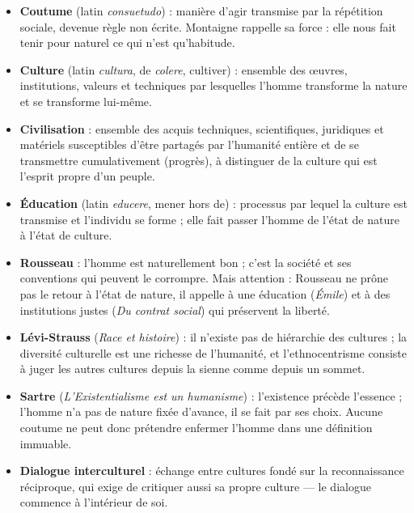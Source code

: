 \documentclass[11pt]{article}
\newcounter{popsec}
\newcounter{popsub}
\newcommand{\courssub}[1]{%
  \stepcounter{popsub}%
  \par\vspace{9pt}\noindent{\popxbold\fontsize{11.5}{13}\selectfont\color{popink}{\color{poporange}\thepopsec.\thepopsub}\hspace{6pt}#1}\par\nopagebreak\vspace{4pt}
}
\begin{document}
\begin{aretenir}
\begin{itemize}
\item \textbf{Coutume} (latin \emph{consuetudo}) : manière d'agir transmise par la répétition sociale, devenue règle non écrite. Montaigne rappelle sa force : elle nous fait tenir pour naturel ce qui n'est qu'habitude.
\item \textbf{Culture} (latin \emph{cultura}, de \emph{colere}, cultiver) : ensemble des œuvres, institutions, valeurs et techniques par lesquelles l'homme transforme la nature et se transforme lui-même.
\item \textbf{Civilisation} : ensemble des acquis techniques, scientifiques, juridiques et matériels susceptibles d'être partagés par l'humanité entière et de se transmettre cumulativement (progrès), à distinguer de la culture qui est l'esprit propre d'un peuple.
\item \textbf{Éducation} (latin \emph{educere}, mener hors de) : processus par lequel la culture est transmise et l'individu se forme ; elle fait passer l'homme de l'état de nature à l'état de culture.
\item \textbf{Rousseau} : l'homme est naturellement bon ; c'est la société et ses conventions qui peuvent le corrompre. Mais attention : Rousseau ne prône pas le retour à l'état de nature, il appelle à une éducation (\emph{Émile}) et à des institutions justes (\emph{Du contrat social}) qui préservent la liberté.
\item \textbf{Lévi-Strauss} (\emph{Race et histoire}) : il n'existe pas de hiérarchie des cultures ; la diversité culturelle est une richesse de l'humanité, et l'ethnocentrisme consiste à juger les autres cultures depuis la sienne comme depuis un sommet.
\item \textbf{Sartre} (\emph{L'Existentialisme est un humanisme}) : l'existence précède l'essence ; l'homme n'a pas de nature fixée d'avance, il se fait par ses choix. Aucune coutume ne peut donc prétendre enfermer l'homme dans une définition immuable.
\item \textbf{Dialogue interculturel} : échange entre cultures fondé sur la reconnaissance réciproque, qui exige de critiquer aussi sa propre culture — le dialogue commence à l'intérieur de soi.
\end{itemize}
\end{aretenir}

\courssub{Démarche et corrigé commenté}
\end{document}
